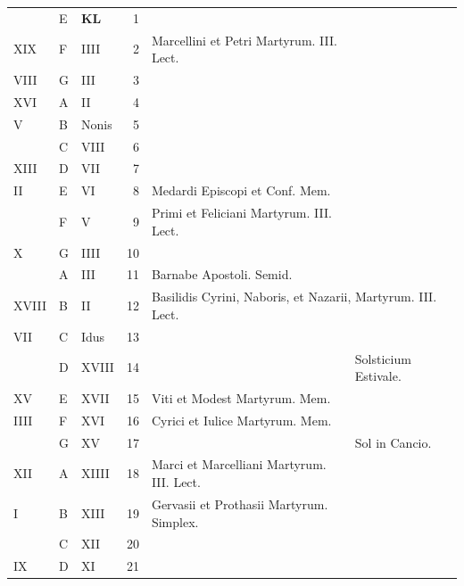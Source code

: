 \documentclass[11pt,openany]{book}
\begin{document}
\begin{center}
\begin{tabular}{l | l | l | r | l l}
\color{Red}  & E & \textbf{\color{Red} K\color{Blue}L} & 1 & & \color{Red} \\
\color{Red} XIX & F & \color{Red} IIII & 2 & Marcellini et Petri Martyrum. III. Lect. & \color{Red} \\
\color{Red} VIII & G & \color{Red} III & 3 & & \color{Red} \\
\color{Red} XVI & \color{Red} A & \color{Red} II & 4 & & \color{Red} \\
\color{Red} V & B & \color{Red} Nonis & 5 & & \color{Red} \\
\color{Red}  & C & \color{Red} VIII & 6 & & \color{Red} \\
\color{Red} XIII & D & \color{Red} VII & 7 & & \color{Red} \\
\color{Red} II & E & \color{Red} VI & 8 & Medardi Episcopi et Conf. Mem. & \color{Red} \\
\color{Red}  & F & \color{Red} V & 9 & Primi et Feliciani Martyrum. III. Lect. & \color{Red} \\
\color{Red} X & G & \color{Red} IIII & 10 & & \color{Red} \\
\color{Red}  & \color{Red} A & \color{Red} III & 11 & \color{Red} Barnabe Apostoli. Semid. \\
\color{Red} XVIII & B & \color{Red} II & 12 & \multicolumn{2}{l}{\color{Red} Basilidis Cyrini, Naboris, et Nazarii, Martyrum. III. Lect.} \\
\color{Red} VII & C & \color{Red} Idus & 13 & & \color{Red} \\
\color{Red}  & D & \color{Red} XVIII & 14 & & Solsticium Estivale. \color{Red} \\
\color{Red} XV & E & \color{Red} XVII & 15 & \color{Red} Viti et Modest Martyrum. Mem. \\
\color{Red} IIII & F & \color{Red} XVI & 16 & \color{Red} Cyrici et Iulice Martyrum. Mem. \\
\color{Red}  & G & \color{Red} XV & 17 & & Sol in Cancio. \color{Red} \\
\color{Red} XII & \color{Red} A & \color{Red} XIIII & 18 & \color{Red} Marci et Marcelliani Martyrum. III. Lect. \\
\color{Red} I & B & \color{Red} XIII & 19 & \color{Red} Gervasii et Prothasii Martyrum. Simplex. \\
\color{Red}  & C & \color{Red} XII & 20 & & \color{Red} \\
\color{Red} IX & D & \color{Red} XI & 21 & & \color{Red} \\

\end{tabular}
\end{center}
\end{document}
